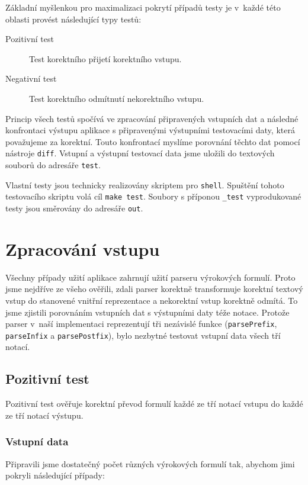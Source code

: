 \documentclass[thesis=B,czech,hidelinks]{thesis}[2012/06/26]
\begin{document}
Základní myšlenkou pro maximalizaci pokrytí případů testy je v~každé této oblasti provést následující typy testů:

\begin{description}
	\item[Pozitivní test] Test korektního přijetí korektního vstupu.
	\item[Negativní test] Test korektního odmítnutí nekorektního vstupu.
\end{description}

Princip všech testů spočívá ve zpracování připravených vstupních dat a následné konfrontaci výstupu aplikace s připravenými výstupními testovacími daty, která považujeme za korektní. Touto konfrontací myslíme porovnání těchto dat pomocí nástroje \texttt{diff}. Vstupní a výstupní testovací data jsme uložili do textových souborů do adresáře \texttt{test}.

Vlastní testy jsou technicky realizovány skriptem pro \texttt{shell}. Spuštění tohoto testovacího skriptu volá cíl \texttt{make test}. Soubory s příponou \texttt{\_test} vyprodukované testy jsou směrovány do adresáře \texttt{out}.

\section{Zpracování vstupu}

Všechny případy užití aplikace zahrnují užití parseru výrokových formulí. Proto jsme nejdříve ze všeho ověřili, zdali parser korektně transformuje korektní textový vstup do stanovené vnitřní reprezentace a nekorektní vstup korektně odmítá. To jsme zjistili porovnáním vstupních dat s výstupními daty téže notace. Protože parser v~naší implementaci reprezentují tři nezávislé funkce (\texttt{parsePrefix}, \texttt{parseInfix} a \texttt{parsePostfix}), bylo nezbytné testovat vstupní data všech tří notací. 

\subsection{Pozitivní test}

Pozitivní test ověřuje korektní převod formulí každé ze tří notací vstupu do každé ze tří notací výstupu.

\subsubsection{Vstupní data}

Připravili jsme dostatečný počet různých výrokových formulí tak, abychom jimi pokryli následující případy:
\end{document}
